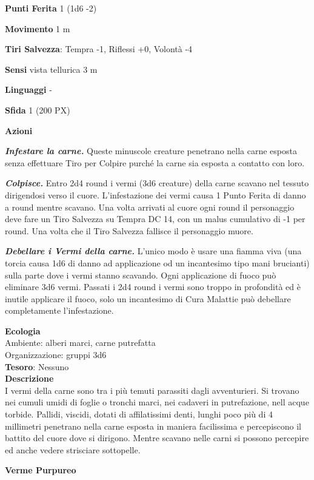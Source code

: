 \begin{multicols}{2}
	\textbf{Punti Ferita} 1 (1d6 -2)

	\textbf{Movimento} 1 m

	\textbf{Tiri Salvezza}: Tempra -1, Riflessi +0, Volontà -4

	\textbf{Sensi} vista tellurica 3 m

	\textbf{Linguaggi} -

	\textbf{Sfida} 1 (200 PX)

	\textbf{Azioni}

	\textit{\textbf{Infestare la carne.}} Queste minuscole creature penetrano nella carne esposta senza effettuare Tiro per Colpire purché la carne sia esposta a contatto con loro.

	\textit{\textbf{Colpisce.}} Entro 2d4 round i vermi (3d6 creature) della carne scavano nel tessuto dirigendosi verso il cuore. L'infestazione dei vermi causa 1 Punto Ferita di danno a round mentre scavano. Una volta arrivati al cuore ogni round il personaggio deve fare un Tiro Salvezza su Tempra DC 14, con un malus cumulativo di -1 per round. Una volta che il Tiro Salvezza fallisce il personaggio muore.

	\textit{\textbf{Debellare i Vermi della carne.}} L'unico modo è usare una fiamma viva (una torcia causa 1d6 di danno ad applicazione od un incantesimo tipo mani brucianti) sulla parte dove i vermi stanno scavando. Ogni applicazione di fuoco può eliminare 3d6 vermi. Passati i 2d4 round i vermi sono troppo in profondità ed è inutile applicare il fuoco, solo un incantesimo di Cura Malattie può debellare completamente l'infestazione.

	\textbf{Ecologia}\\
	Ambiente: alberi marci, carne putrefatta\\
	Organizzazione: gruppi 3d6\\
	\textbf{Tesoro}: Nessuno\\
	\textbf{Descrizione}\\

	I vermi della carne sono tra i più temuti parassiti dagli avventurieri. Si trovano nei cumuli umidi di foglie o tronchi marci, nei cadaveri in putrefazione, nell acque torbide. Pallidi, viscidi, dotati di affilatissimi denti, lunghi poco più di 4 millimetri penetrano nella carne esposta in maniera facilissima e percepiscono il battito del cuore dove si dirigono. Mentre scavano nelle carni si possono percepire ed anche vedere strisciare sottopelle.


	\medskip{}\textbf{Verme Purpureo}


\end{multicols}

